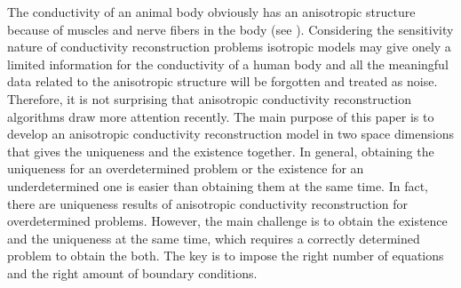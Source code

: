 \documentclass[11pt]{amsart}
\theoremstyle{plain}
\numberwithin{equation}{section}
\numberwithin{Thm}{section}
\begin{document}
The conductivity of an animal body obviously has an anisotropic structure because of muscles and nerve fibers in the body (see \cite{Nicholson1965386,Roth2000}). Considering the sensitivity nature of conductivity reconstruction problems isotropic models may give onely a limited information for the conductivity of a human body and all the meaningful data related to the anisotropic structure will be forgotten and treated as noise. Therefore, it is not surprising that anisotropic conductivity reconstruction algorithms draw more attention recently. The main purpose of this paper is to develop an anisotropic conductivity reconstruction model in two space dimensions that gives the uniqueness and the existence together. In general, obtaining the uniqueness for an overdetermined problem or the existence for an underdetermined one is easier than obtaining them at the same time. In fact, there are uniqueness results of anisotropic conductivity reconstruction for overdetermined problems. However, the main challenge is to obtain the existence and the uniqueness at the same time, which requires a correctly determined problem to obtain the both. The key is to impose the right number of equations and the right amount of boundary conditions.
\end{document}
